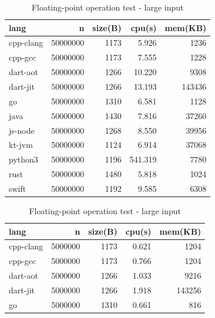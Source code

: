\begin{table}[htbp]
    \centering
    \caption{Memory allocation test}
    \label{tab:n-body}
    \begin{subtable}[h]{0.495\linewidth}
        \centering
        \begin{tabular}{lrrrr}
            \toprule
            lang      & n        & size(B) & cpu(s)  & mem(KB) \\
            \midrule
            cpp-clang & 50000000 & 1173    & 5.926   & 1236    \\
            cpp-gcc   & 50000000 & 1173    & 7.555   & 1228    \\
            dart-aot  & 50000000 & 1266    & 10.220  & 9308    \\
            dart-jit  & 50000000 & 1266    & 13.193  & 143436  \\
            go        & 50000000 & 1310    & 6.581   & 1128    \\
            java      & 50000000 & 1430    & 7.816   & 37260   \\
            js-node   & 50000000 & 1268    & 8.550   & 39956   \\
            kt-jvm    & 50000000 & 1124    & 6.914   & 37068   \\
            python3   & 50000000 & 1196    & 541.319 & 7780    \\
            rust      & 50000000 & 1480    & 5.818   & 1024    \\
            swift     & 50000000 & 1192    & 9.585   & 6308    \\
            \bottomrule
        \end{tabular}
        \caption{Floating-point operation test - large input}
        \label{tab:n-body-1}
    \end{subtable}
    \begin{subtable}[h]{0.495\linewidth}
        \centering
        \begin{tabular}{lrrrr}
            \toprule
            lang      & n       & size(B) & cpu(s) & mem(KB) \\
            \midrule
            cpp-clang & 5000000 & 1173    & 0.621  & 1204    \\
            cpp-gcc   & 5000000 & 1173    & 0.766  & 1204    \\
            dart-aot  & 5000000 & 1266    & 1.033  & 9216    \\
            dart-jit  & 5000000 & 1266    & 1.918  & 143256  \\
            go        & 5000000 & 1310    & 0.661  & 816     \\

\end{tabular}
\end{subtable}
\end{table}
